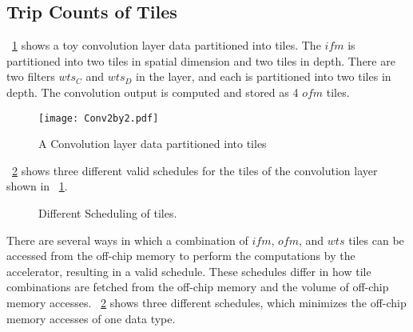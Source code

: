 \subsection{Trip Counts of Tiles}\label{sec:TripCount}
\figurename~\ref{fig:convPartitionedLayer} shows a toy convolution layer data partitioned into tiles. The $ifm$ is partitioned into two tiles in spatial dimension and two tiles in depth. There are two filters $wts_C$ and $wts_D$ in the layer, and each is partitioned into two tiles in depth. The convolution output is computed and stored as 4 $ofm$ tiles.
\begin{figure}[!htb]
	\centering
	\captionsetup{font=sf}	
	\texttt{[image: Conv2by2.pdf]}
	\caption{A Convolution layer data partitioned into tiles }
	\label{fig:convPartitionedLayer}
\end{figure}
\figurename~\ref{fig:differentScheduling} shows three different valid schedules for the tiles of the convolution layer shown in \figurename~\ref{fig:convPartitionedLayer}. 
\begin{figure}[!htb]
	\centering
	\captionsetup{font=sf}
    \hfil		
	\hfil	
	\hfil	
	\caption{Different Scheduling of tiles.}
	\label{fig:differentScheduling}
\end{figure}

There are several ways in which a  combination of $ifm$, $ofm$, and $wts$ tiles can be accessed from the off-chip memory to perform the computations by the accelerator, resulting in a valid schedule. These schedules differ in how tile combinations are fetched from the off-chip memory and the volume of off-chip memory accesses. \figurename~\ref{fig:differentScheduling} shows three different schedules, which minimizes the off-chip memory accesses of one data type.

